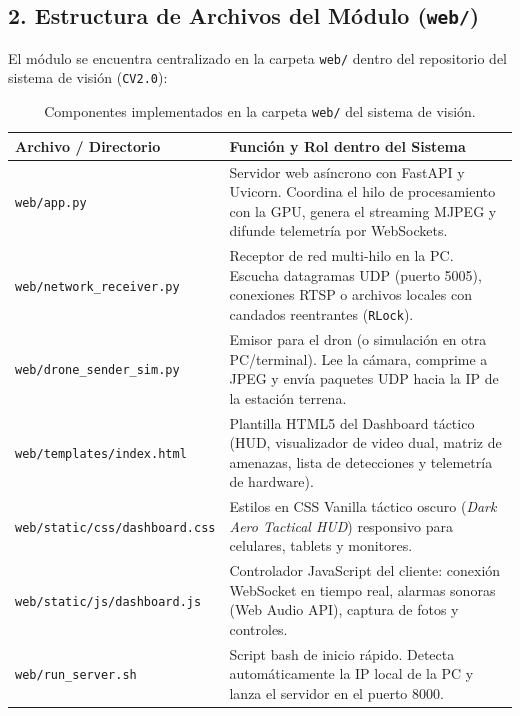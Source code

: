\documentclass[11pt,a4paper]{article}
\begin{document}
\subsection*{2. Estructura de Archivos del Módulo (\texttt{web/})}

El módulo se encuentra centralizado en la carpeta \texttt{web/} dentro del repositorio del sistema de visión (\texttt{CV2.0}):

\begin{table}[H]
\centering
\small
\begin{tabularx}{\textwidth}{l>{\raggedright\arraybackslash}X}
\toprule
\textbf{Archivo / Directorio} & \textbf{Función y Rol dentro del Sistema} \\
\midrule
\texttt{web/app.py} & Servidor web asíncrono con FastAPI y Uvicorn. Coordina el hilo de procesamiento con la GPU, genera el streaming MJPEG y difunde telemetría por WebSockets. \\
\texttt{web/network\_receiver.py} & Receptor de red multi-hilo en la PC. Escucha datagramas UDP (puerto 5005), conexiones RTSP o archivos locales con candados reentrantes (\texttt{RLock}). \\
\texttt{web/drone\_sender\_sim.py} & Emisor para el dron (o simulación en otra PC/terminal). Lee la cámara, comprime a JPEG y envía paquetes UDP hacia la IP de la estación terrena. \\
\texttt{web/templates/index.html} & Plantilla HTML5 del Dashboard táctico (HUD, visualizador de video dual, matriz de amenazas, lista de detecciones y telemetría de hardware). \\
\texttt{web/static/css/dashboard.css} & Estilos en CSS Vanilla táctico oscuro (\textit{Dark Aero Tactical HUD}) responsivo para celulares, tablets y monitores. \\
\texttt{web/static/js/dashboard.js} & Controlador JavaScript del cliente: conexión WebSocket en tiempo real, alarmas sonoras (Web Audio API), captura de fotos y controles. \\
\texttt{web/run\_server.sh} & Script bash de inicio rápido. Detecta automáticamente la IP local de la PC y lanza el servidor en el puerto 8000. \\
\bottomrule
\end{tabularx}
\caption{Componentes implementados en la carpeta \texttt{web/} del sistema de visión.}
\label{tab:estructura_web}
\end{table}
\end{document}
